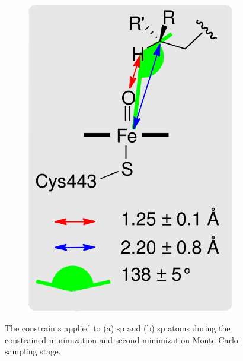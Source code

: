 \begin{figure}
\begin{subfigure}[b]{0.35\textwidth}
    \includegraphics[width=1.0\textwidth]{figures/idsite/34a}
    \caption{}
    \label{figure:second_sp3_constraints}
    \end{subfigure}
    \caption{The constraints applied to (a) sp and (b) sp atoms during the constrained minimization and second minimization Monte Carlo sampling stage.}
    \label{figure:second_constraints}
\end{figure}
